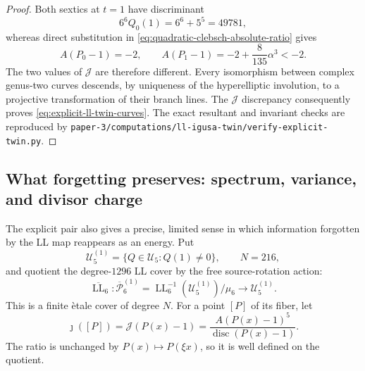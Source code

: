\begin{proof}
Both sextics at $t=1$ have discriminant
\begin{equation}
 6^6Q_0(1)=6^6+5^5=49781,
 \label{eq:explicit-ll-twin-common-discriminant}
\end{equation}
whereas direct substitution in \eqref{eq:quadratic-clebsch-absolute-ratio}
gives
\begin{equation}
 A(P_0-1)=-2,
 \qquad
 A(P_1-1)=-2+\frac8{135}\alpha^3<-2.
 \label{eq:explicit-ll-twin-clebsch-values}
\end{equation}
The two values of $\mathcal J$ are therefore different.  Every isomorphism
between complex genus-two curves descends, by uniqueness of the hyperelliptic
involution, to a projective transformation of their branch lines.  The
$\mathcal J$ discrepancy consequently proves
\eqref{eq:explicit-ll-twin-curves}.  The exact resultant and invariant checks
are reproduced by
\texttt{paper-3/computations/ll-igusa-twin/verify-explicit-twin.py}.
\end{proof}

\subsection{What forgetting preserves: spectrum, variance, and divisor charge}

The explicit pair also gives a precise, limited sense in which information
forgotten by the LL map reappears as an energy.  Put
\begin{equation}
 \mathcal U_5^{(1)}
 =\{Q\in\mathcal U_5:Q(1)\ne0\},
 \qquad N=216,
 \label{eq:ll-energy-base}
\end{equation}
and quotient the degree-$1296$ LL cover by the free source-rotation action:
\begin{equation}
 \overline{\operatorname{LL}}_6:
 \overline{\mathcal P}_6^{(1)}
 =\operatorname{LL}_6^{-1}(\mathcal U_5^{(1)})/\mu_6
 \longrightarrow \mathcal U_5^{(1)}.
 \label{eq:ll-quotient-cover-for-energy}
\end{equation}
This is a finite \`etale cover of degree $N$.  For a point $[P]$ of its fiber,
let
\begin{equation}
 \jmath([P])
 =\mathcal J(P(x)-1)
 =\frac{A(P(x)-1)^5}{\operatorname{disc}(P(x)-1)}.
 \label{eq:ll-sheet-moduli-observable}
\end{equation}
The ratio is unchanged by $P(x)\mapsto P(\xi x)$, so it is well defined on
the quotient.


